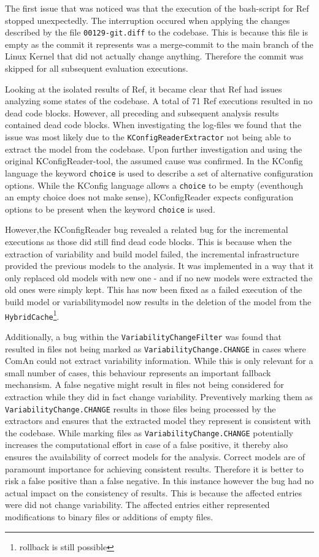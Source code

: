 \documentclass[a4paper]{article}
\begin{document}
The first issue that was noticed was that the execution of the bash-script for Ref stopped unexpectedly. The interruption occured when applying the changes described by the file \texttt{00129-git.diff} to the codebase. This is because this file is empty as the commit it represents was a merge-commit to the main branch of the Linux Kernel that did not actually change anything. Therefore the commit was skipped for all subsequent evaluation executions.

Looking at the isolated results of Ref, it became clear that Ref had issues analyzing some states of the codebase. A total of 71 Ref executions resulted in no dead code blocks. However, all preceding and subsequent analysis results contained dead code blocks. When investigating the log-files we found that the issue was most likely due to the \texttt{KConfigReaderExtractor} not being able to extract the model from the codebase. Upon further investigation and using the original KConfigReader-tool, the assumed cause was confirmed. In the KConfig language the keyword \texttt{choice} is used to describe a set of alternative configuration options. While the KConfig language allows a \texttt{choice} to be empty (eventhough an empty choice does not make sense), KConfigReader expects configuration options to be present when the keyword \texttt{choice} is used. 

However,the KConfigReader bug revealed a related bug for the incremental executions as those did still find dead code blocks. This is because when the extraction of variability and build model failed, the incremental infrastructure provided the previous models to the analysis. It was implemented in a way that it only replaced old models with new one - and if no new models were extracted the old ones were simply kept. This has now been fixed as a failed execution of the build model or variabilitymodel now results in the deletion of the model from the \texttt{Hybrid\-Cache}\footnote{rollback is still possible}.

Additionally, a bug within the \texttt{VariabilityChangeFilter} was found that resulted in files not being marked as \texttt{VariabilityChange.CHANGE} in cases where ComAn could not extract variability information. While this is only relevant for a small number of cases, this behaviour represents an important fallback mechansism. A false negative might result in files not being considered for extraction while they did in fact change variability. Preventively marking them as \texttt{VariabilityChange.CHANGE} results in those files being processed by the extractors and ensures that the extracted model they represent is consistent with the codebase. While marking files as \texttt{VariabilityChange.CHANGE} potentially increases the computational effort in case of a false positive, it thereby also ensures the availability of correct models for the analysis. Correct models are of paramount importance for achieving consistent results. Therefore it is better to risk a false positive than a false negative. In this instance however the bug had no actual impact on the consistency of results. This is because the affected entries were did not change variability. The affected entries either represented modifications to binary files or additions of empty files.
\end{document}
